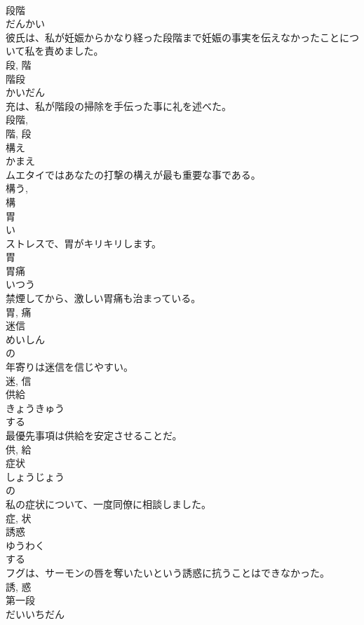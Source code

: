 \documentclass[8pt]{extreport}
\begin{document}
\begin{CJK}{UTF8}{min}
\\	段階	
\\	だんかい	
\\	彼氏は、私が妊娠からかなり経った段階まで妊娠の事実を伝えなかったことについて私を責めました。	
\\	段, 階	
\\	階段	
\\	かいだん	
\\	充は、私が階段の掃除を手伝った事に礼を述べた。	
\\	段階, 
\\	階, 段	
\\	構え	
\\	かまえ	
\\	ムエタイではあなたの打撃の構えが最も重要な事である。	
\\	構う, 
\\	構	
\\	胃	
\\	い	
\\	ストレスで、胃がキリキリします。	
\\	胃	
\\	胃痛	
\\	いつう	
\\	禁煙してから、激しい胃痛も治まっている。	
\\	胃, 痛	
\\	迷信	
\\	めいしん	
\\	の 
\\	年寄りは迷信を信じやすい。	
\\	迷, 信	
\\	供給	
\\	きょうきゅう	
\\	する 
\\	最優先事項は供給を安定させることだ。	
\\	供, 給	
\\	症状	
\\	しょうじょう	
\\	の 
\\	私の症状について、一度同僚に相談しました。	
\\	症, 状	
\\	誘惑	
\\	ゆうわく	
\\	する 
\\	フグは、サーモンの唇を奪いたいという誘惑に抗うことはできなかった。	
\\	誘, 惑	
\\	第一段	
\\	だいいちだん	

\end{CJK}
\end{document}

